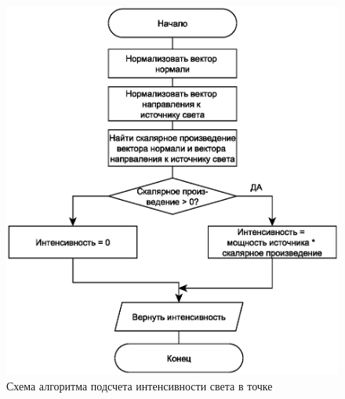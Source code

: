 \begin{figure}[H]
	\centering
	\includegraphics[scale=0.7]{img/light.eps}
	\caption{Схема алгоритма подсчета интенсивности света в точке}
	\label{fig:inten}
\end{figure}

